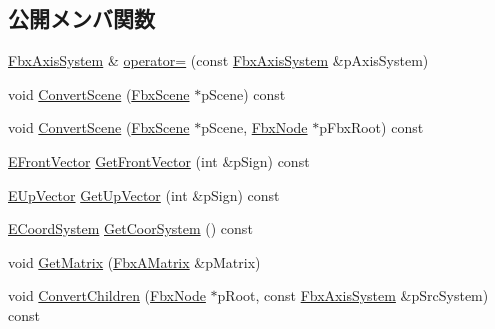 \subsection*{公開メンバ関数}
\begin{DoxyCompactItemize}
\item 
\hyperlink{class_fbx_axis_system}{Fbx\+Axis\+System} \& \hyperlink{class_fbx_axis_system_a108da01b311416d5b60305ac170e5be5}{operator=} (const \hyperlink{class_fbx_axis_system}{Fbx\+Axis\+System} \&p\+Axis\+System)
\item 
void \hyperlink{class_fbx_axis_system_abb9a361cd8d245c60e68b05868c67b4e}{Convert\+Scene} (\hyperlink{class_fbx_scene}{Fbx\+Scene} $\ast$p\+Scene) const
\item 
void \hyperlink{class_fbx_axis_system_a25f6f6ddb481f280bfecca5d39d14d4c}{Convert\+Scene} (\hyperlink{class_fbx_scene}{Fbx\+Scene} $\ast$p\+Scene, \hyperlink{class_fbx_node}{Fbx\+Node} $\ast$p\+Fbx\+Root) const
\item 
\hyperlink{class_fbx_axis_system_a34bce1daad7ed6ae71916bb825d3ec87}{E\+Front\+Vector} \hyperlink{class_fbx_axis_system_a523996d3b195bf6016ab7c0333a5d389}{Get\+Front\+Vector} (int \&p\+Sign) const
\item 
\hyperlink{class_fbx_axis_system_ad41a41f7ccd9167f54d09b65ad781d00}{E\+Up\+Vector} \hyperlink{class_fbx_axis_system_a3ed72f373b701c5f7c108e93f23e0e73}{Get\+Up\+Vector} (int \&p\+Sign) const
\item 
\hyperlink{class_fbx_axis_system_a7cf0485846b560fa34f86932c02ec333}{E\+Coord\+System} \hyperlink{class_fbx_axis_system_a6ebdf99e9754d3bd83d3a8f98544b331}{Get\+Coor\+System} () const
\item 
void \hyperlink{class_fbx_axis_system_a2ee31cfe8c836f4abdbc939a0891a6a9}{Get\+Matrix} (\hyperlink{class_fbx_a_matrix}{Fbx\+A\+Matrix} \&p\+Matrix)
\item 
void \hyperlink{class_fbx_axis_system_a3eff3d4a3b2270a5f3675f32b698e6e9}{Convert\+Children} (\hyperlink{class_fbx_node}{Fbx\+Node} $\ast$p\+Root, const \hyperlink{class_fbx_axis_system}{Fbx\+Axis\+System} \&p\+Src\+System) const
\end{DoxyCompactItemize}
